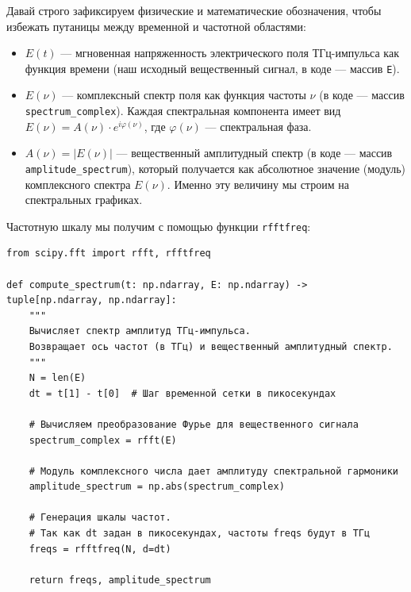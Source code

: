 
Давай строго зафиксируем физические и математические обозначения, чтобы избежать путаницы между временной и частотной областями:
\begin{itemize}
    \item $E(t)$ — мгновенная напряженность электрического поля ТГц-импульса как функция времени (наш исходный вещественный сигнал, в коде — массив \texttt{E}).
    \item $E(\nu)$ — комплексный спектр поля как функция частоты $\nu$ (в коде — массив \texttt{spectrum\_complex}). Каждая спектральная компонента имеет вид $E(\nu) = A(\nu) \cdot e^{i \varphi(\nu)}$, где $\varphi(\nu)$ — спектральная фаза.
    \item $A(\nu) = |E(\nu)|$ — вещественный амплитудный спектр (в коде — массив \texttt{amplitude\_spectrum}), который получается как абсолютное значение (модуль) комплексного спектра $E(\nu)$. Именно эту величину мы строим на спектральных графиках.
\end{itemize}

Частотную шкалу мы получим с помощью функции \texttt{rfftfreq}:

\begin{listing}[H]
	\caption{Вычисление спектра амплитуд (spectrum.py)}
	\begin{verbatim}
from scipy.fft import rfft, rfftfreq

def compute_spectrum(t: np.ndarray, E: np.ndarray) -> tuple[np.ndarray, np.ndarray]:
    """
    Вычисляет спектр амплитуд ТГц-импульса.
    Возвращает ось частот (в ТГц) и вещественный амплитудный спектр.
    """
    N = len(E)
    dt = t[1] - t[0]  # Шаг временной сетки в пикосекундах
    
    # Вычисляем преобразование Фурье для вещественного сигнала
    spectrum_complex = rfft(E)
    
    # Модуль комплексного числа дает амплитуду спектральной гармоники
    amplitude_spectrum = np.abs(spectrum_complex)
    
    # Генерация шкалы частот.
    # Так как dt задан в пикосекундах, частоты freqs будут в ТГц
    freqs = rfftfreq(N, d=dt)
    
    return freqs, amplitude_spectrum
	\end{verbatim}
\end{listing}



